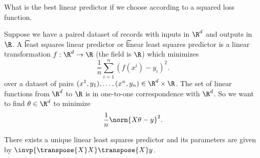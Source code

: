 

What is the best linear predictor if we choose according to a squared loss function.


Suppose we have a paired dataset of records with inputs in $\R^d$ and outputs in $\R$.
A \t{least squares linear predictor} or \t{linear least squares predictor} is a linear transformation $f: \R^d \to \R$ (the field is $\R$) which minimizes
\[
  \frac{1}{n} \sum_{i = 1}^{n} (f(x^i) - y_i)^2.
\]
over a dataset of pairs $(x^1, y_1), \dots, (x^n, y_n) \in \R^d \times \R$.
The set of linear functions from $\R^d$ to $\R$ is in one-to-one correspondence with $\R^d$.
So we want to find $\theta \in \R^d$ to  minimize
\[
  \frac{1}{n} \norm{X\theta - y}^2.
\]

\begin{proposition}
There exists a unique linear least squares predictor and its parameters are given by $\invp{\transpose{X}X}\transpose{X}y$.
\end{proposition}


\blankpage
